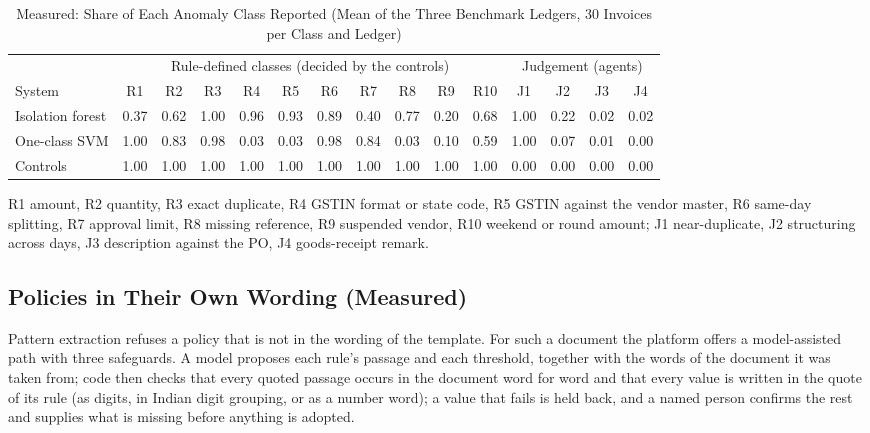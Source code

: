 \documentclass[conference]{IEEEtran}
\begin{document}
\begin{table}[t]
\caption{Measured: Share of Each Anomaly Class Reported (Mean of the Three Benchmark Ledgers, 30 Invoices per Class and Ledger)}
\label{tab:perclass}
\centering
\footnotesize
\setlength{\tabcolsep}{3.2pt}
\begin{tabular}{lcccccccccc|cccc}
\toprule
 & \multicolumn{10}{c|}{Rule-defined classes (decided by the controls)} & \multicolumn{4}{c}{Judgement (agents)} \\
System & R1 & R2 & R3 & R4 & R5 & R6 & R7 & R8 & R9 & R10 & J1 & J2 & J3 & J4 \\
\midrule
Isolation forest & 0.37 & 0.62 & 1.00 & 0.96 & 0.93 & 0.89 & 0.40 & 0.77 & 0.20 & 0.68 & 1.00 & 0.22 & 0.02 & 0.02 \\
One-class SVM & 1.00 & 0.83 & 0.98 & 0.03 & 0.03 & 0.98 & 0.84 & 0.03 & 0.10 & 0.59 & 1.00 & 0.07 & 0.01 & 0.00 \\
Controls & 1.00 & 1.00 & 1.00 & 1.00 & 1.00 & 1.00 & 1.00 & 1.00 & 1.00 & 1.00 & 0.00 & 0.00 & 0.00 & 0.00 \\
\bottomrule
\end{tabular}

\vspace{3pt}
\parbox{0.84\textwidth}{\scriptsize R1 amount, R2 quantity, R3 exact duplicate, R4 GSTIN format or state code, R5 GSTIN against the vendor master, R6 same-day splitting, R7 approval limit, R8 missing reference, R9 suspended vendor, R10 weekend or round amount; J1 near-duplicate, J2 structuring across days, J3 description against the PO, J4 goods-receipt remark.}
\end{table}

\subsection{Policies in Their Own Wording (Measured)}
\label{sec:freeform}
Pattern extraction refuses a policy that is not in the wording of the template. For such a document the platform offers a model-assisted path with three safeguards. A model proposes each rule's passage and each threshold, together with the words of the document it was taken from; code then checks that every quoted passage occurs in the document word for word and that every value is written in the quote of its rule (as digits, in Indian digit grouping, or as a number word); a value that fails is held back, and a named person confirms the rest and supplies what is missing before anything is adopted.
\end{document}
